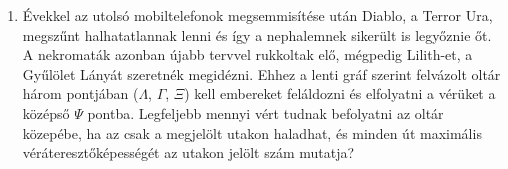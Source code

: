 \documentclass[a4paper, 12pt]{article}
\begin{document}
\begin{enumerate}

            \item Évekkel az utolsó mobiltelefonok megsemmisítése után Diablo, a Terror Ura, megszűnt halhatatlannak lenni és így a nephalemnek sikerült is legyőznie őt. A nekromaták azonban újabb tervvel rukkoltak elő, mégpedig Lilith-et, a Gyűlölet Lányát szeretnék megidézni. Ehhez a lenti gráf szerint felvázolt oltár három pontjában ($\Lambda$, $\Gamma$, $\Xi$) kell embereket feláldozni és elfolyatni a vérüket a középső $\Psi$ pontba. Legfeljebb mennyi vért tudnak befolyatni az oltár közepébe, ha az csak a megjelölt utakon haladhat, és minden út maximális véráteresztőképességét az utakon jelölt szám mutatja?
            \begin{figure}[!ht]
                \centering
                
            \end{figure}
        \end{enumerate}
    
\end{document}
